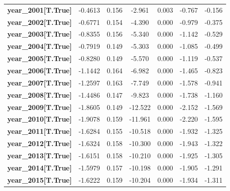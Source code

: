 \begin{center}
\begin{tabular}{lcccccc}
\textbf{year\_2001[T.True]} &      -0.4613  &        0.156     &    -2.961  &         0.003        &       -0.767    &       -0.156     \\
\textbf{year\_2002[T.True]} &      -0.6771  &        0.154     &    -4.390  &         0.000        &       -0.979    &       -0.375     \\
\textbf{year\_2003[T.True]} &      -0.8355  &        0.156     &    -5.340  &         0.000        &       -1.142    &       -0.529     \\
\textbf{year\_2004[T.True]} &      -0.7919  &        0.149     &    -5.303  &         0.000        &       -1.085    &       -0.499     \\
\textbf{year\_2005[T.True]} &      -0.8280  &        0.149     &    -5.570  &         0.000        &       -1.119    &       -0.537     \\
\textbf{year\_2006[T.True]} &      -1.1442  &        0.164     &    -6.982  &         0.000        &       -1.465    &       -0.823     \\
\textbf{year\_2007[T.True]} &      -1.2597  &        0.163     &    -7.749  &         0.000        &       -1.578    &       -0.941     \\
\textbf{year\_2008[T.True]} &      -1.4486  &        0.147     &    -9.823  &         0.000        &       -1.738    &       -1.160     \\
\textbf{year\_2009[T.True]} &      -1.8605  &        0.149     &   -12.522  &         0.000        &       -2.152    &       -1.569     \\
\textbf{year\_2010[T.True]} &      -1.9078  &        0.159     &   -11.961  &         0.000        &       -2.220    &       -1.595     \\
\textbf{year\_2011[T.True]} &      -1.6284  &        0.155     &   -10.518  &         0.000        &       -1.932    &       -1.325     \\
\textbf{year\_2012[T.True]} &      -1.6324  &        0.158     &   -10.300  &         0.000        &       -1.943    &       -1.322     \\
\textbf{year\_2013[T.True]} &      -1.6151  &        0.158     &   -10.210  &         0.000        &       -1.925    &       -1.305     \\
\textbf{year\_2014[T.True]} &      -1.5979  &        0.157     &   -10.198  &         0.000        &       -1.905    &       -1.291     \\
\textbf{year\_2015[T.True]} &      -1.6222  &        0.159     &   -10.204  &         0.000        &       -1.934    &       -1.311     \\

\end{tabular}
\end{center}
